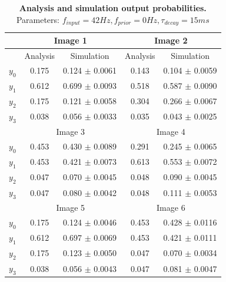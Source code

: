 \begin{table}[]
\label{tab:1D_42_0_15}
\small
\tabcolsep=0.11cm
\begin{tabular}{|c|cc|cc|}
\hline
                       & \multicolumn{2}{c|}{Image 1}                       & \multicolumn{2}{c|}{Image 2}                       \\ \hline
                       & \multicolumn{1}{c|}{Analysis} & Simulation         & \multicolumn{1}{c|}{Analysis} & Simulation         \\ \hline
$y_0$                  & \multicolumn{1}{c|}{0.175}    & 0.124 $\pm$ 0.0061 & \multicolumn{1}{c|}{0.143}    & 0.104 $\pm$ 0.0059 \\ \hline
$y_1$                  & \multicolumn{1}{c|}{0.612}    & 0.699 $\pm$ 0.0093 & \multicolumn{1}{c|}{0.518}    & 0.587 $\pm$ 0.0090 \\ \hline
$y_2$                  & \multicolumn{1}{c|}{0.175}    & 0.121 $\pm$ 0.0058 & \multicolumn{1}{c|}{0.304}    & 0.266 $\pm$ 0.0067 \\ \hline
$y_3$                  & \multicolumn{1}{c|}{0.038}    & 0.056 $\pm$ 0.0033 & \multicolumn{1}{c|}{0.035}    & 0.043 $\pm$ 0.0025 \\ \hline
                       & \multicolumn{2}{c|}{Image 3}                       & \multicolumn{2}{c|}{Image 4}                       \\ \hline
$y_0$                  & \multicolumn{1}{c|}{0.453}    & 0.430 $\pm$ 0.0089 & \multicolumn{1}{c|}{0.291}    & 0.245 $\pm$ 0.0065 \\ \hline
$y_1$                  & \multicolumn{1}{c|}{0.453}    & 0.421 $\pm$ 0.0073 & \multicolumn{1}{c|}{0.613}    & 0.553 $\pm$ 0.0072 \\ \hline
$y_2$                  & \multicolumn{1}{c|}{0.047}    & 0.070 $\pm$ 0.0045 & \multicolumn{1}{c|}{0.048}    & 0.090 $\pm$ 0.0045 \\ \hline
$y_3$                  & \multicolumn{1}{c|}{0.047}    & 0.080 $\pm$ 0.0042 & \multicolumn{1}{c|}{0.048}    & 0.111 $\pm$ 0.0053 \\ \hline
						& \multicolumn{2}{c|}{Image 5}                       & \multicolumn{2}{c|}{Image 6}                       \\ \hline
$y_0$                  & \multicolumn{1}{c|}{0.175}    & 0.124 $\pm$ 0.0046 & \multicolumn{1}{c|}{0.453}    & 0.428 $\pm$ 0.0116 \\ \hline
$y_1$                  & \multicolumn{1}{c|}{0.612}    & 0.697 $\pm$ 0.0069 & \multicolumn{1}{c|}{0.453}    & 0.421 $\pm$ 0.0111 \\ \hline
$y_2$                  & \multicolumn{1}{c|}{0.175}    & 0.123 $\pm$ 0.0050 & \multicolumn{1}{c|}{0.047}    & 0.070 $\pm$ 0.0034 \\ \hline
$y_3$                  & \multicolumn{1}{c|}{0.038}    & 0.056 $\pm$ 0.0043 & \multicolumn{1}{c|}{0.047}    & 0.081 $\pm$ 0.0047 \\ \hline
\end{tabular}
\caption{\textbf{Analysis and simulation output probabilities. } Parameters: $f_{input} = 42 Hz, f_{prior} = 0 Hz, \tau_{decay} = 15 ms$}
\end{table}

